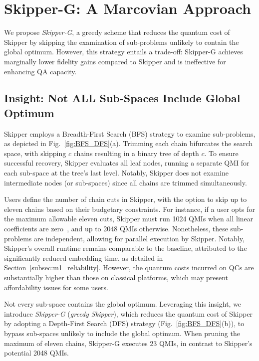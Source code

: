 \newpage
\section{Skipper-G: A Marcovian Approach}

We propose \emph{Skipper-G}, a greedy scheme that reduces the quantum cost of Skipper by skipping the examination of sub-problems unlikely to contain the global optimum. 
However, this strategy entails a trade-off: Skipper-G achieves marginally lower fidelity gains compared to Skipper and is ineffective for enhancing QA capacity.

\subsection{Insight: Not ALL Sub-Spaces Include Global Optimum}

Skipper employs a Breadth-First Search (BFS) strategy to examine sub-problems, as depicted in Fig.~\ref{fig:BFS_DFS}(a). 
Trimming each chain bifurcates the search space, with skipping $c$ chains resulting in a binary tree of depth $c$. 
To ensure successful recovery, Skipper evaluates all leaf nodes, running a separate QMI for each sub-space at the tree's last level. 
Notably, Skipper does not examine intermediate nodes (or sub-spaces) since all chains are trimmed simultaneously. 

Users define the number of chain cuts in Skipper, with the option to skip up to eleven chains based on their budgetary constraints. 
For instance, if a user opts for the maximum allowable eleven cuts, Skipper must run 1024 QMIs when all linear coefficients are zero~\cite{ayanzadeh2023frozenqubits}, and up to 2048 QMIs otherwise.
Nonetheless, these sub-problems are independent, allowing for parallel execution by Skipper. 
Notably, Skipper's overall runtime remains comparable to the baseline, attributed to the significantly reduced embedding time, as detailed in Section~\ref{subsec:m1_reliability}.
However, the quantum costs incurred on QCs are substantially higher than those on classical platforms, which may present affordability issues for some users.

Not every sub-space contains the global optimum. 
Leveraging this insight, we introduce \emph{Skipper-G} (\emph{greedy Skipper}), which reduces the quantum cost of Skipper by adopting a Depth-First Search (DFS) strategy (Fig.~\ref{fig:BFS_DFS}(b)), to bypass sub-spaces unlikely to include the global optimum.
When pruning the maximum of eleven chains, Skipper-G executes 23 QMIs, in contrast to Skipper's potential 2048 QMIs.

